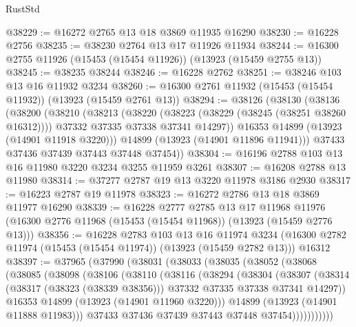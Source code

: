 \begin{lexlean}{RustStd}
\begin{coremodule}
@38229 := @16272 @2765 @13 @18 @3869 @11935 @16290
@38230 := @16228 @2756
@38235 := @38230 @2764 @13 @17 @11926 @11934
@38244 := @16300 @2755 @11926 (@15453 (@15454 @11926)) (@13923 (@15459 @2755 @13))
@38245 := @38235 @38244
@38246 := @16228 @2762
@38251 := @38246 @103 @13 @16 @11932 @3234
@38260 := @16300 @2761 @11932 (@15453 (@15454 @11932)) (@13923 (@15459 @2761 @13))
@38294 := @38126
    (@38130
      (@38136
        (@38200
          (@38210
            (@38213
              (@38220
                (@38223 (@38229 (@38245 (@38251 @38260 @16312))))
                @37332
                @37335
                @37338
                @37341
                @14297))
            @16353
            @14899
            (@13923 (@14901 @11918 @3220)))
          @14899
          (@13923 (@14901 @11896 @11941)))
        @37433
        @37436
        @37439
        @37443
        @37448
        @37454))
@38304 := @16196 @2788 @103 @13 @16 @11980 @3220 @3234 @3255 @11959 @3261
@38307 := @16208 @2788 @13 @11980
@38314 := @37277 @2787 @19 @13 @3220 @11978 @3186 @2930
@38317 := @16223 @2787 @19 @11978
@38323 := @16272 @2786 @13 @18 @3869 @11977 @16290
@38339 := @16228
    @2777
    @2785
    @13
    @17
    @11968
    @11976
    (@16300 @2776 @11968 (@15453 (@15454 @11968)) (@13923 (@15459 @2776 @13)))
@38356 := @16228
    @2783
    @103
    @13
    @16
    @11974
    @3234
    (@16300 @2782 @11974 (@15453 (@15454 @11974)) (@13923 (@15459 @2782 @13)))
    @16312
@38397 := @37965
    (@37990
      (@38031
        (@38033
          (@38035
            (@38052
              (@38068
                (@38085
                  (@38098
                    (@38106
                      (@38110
                        (@38116
                          (@38294
                            (@38304
                              (@38307
                                (@38314
                                  (@38317 (@38323 (@38339 @38356)))
                                  @37332
                                  @37335
                                  @37338
                                  @37341
                                  @14297))
                              @16353
                              @14899
                              (@13923 (@14901 @11960 @3220)))
                            @14899
                            (@13923 (@14901 @11888 @11983)))
                          @37433
                          @37436
                          @37439
                          @37443
                          @37448
                          @37454)))))))))))

\end{coremodule}
\end{lexlean}
